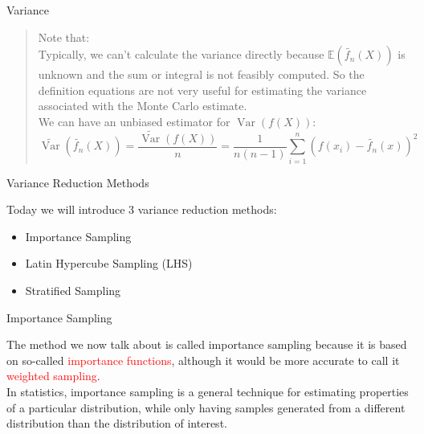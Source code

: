 \begin{frame}{Variance}
\begin{quote}

Note that:\\
Typically, we can't calculate the variance directly because $\mathbb{E}\left(\widetilde{f_{n}}(X)\right)$ is unknown and the sum or integral is not feasibly computed. So the definition equations are not very useful for estimating the variance associated with the Monte Carlo estimate.\\ 
We can have an unbiased estimator for $\operatorname{Var}(f(X))$:\\

\[ \widetilde{\operatorname{Var}}\left(\widetilde{f_{n}}(X)\right)=\frac{\widetilde{\operatorname{Var}}(f(X))}{n}=\frac{1}{n(n-1)} \sum_{i=1}^{n}\left(f\left(x_{i}\right)-\widetilde{f_{n}}(x)\right)^{2} \]

\end{quote}

\end{frame}

\begin{frame}{Variance Reduction Methods}

Today we will introduce 3 variance reduction methods:\\
\begin{itemize}
\item Importance Sampling
\item Latin Hypercube Sampling (LHS)
\item Stratified Sampling

\end{itemize}
\end{frame}

\begin{frame}{Importance Sampling}
\begin{definition}
The method we now talk about is called importance sampling because it is based on so-called \textcolor{red}{importance functions}, although it would be more accurate to call it \textcolor{red}{weighted sampling}.\\
In statistics, importance sampling is a general technique for estimating properties of a particular distribution, while only having samples generated from a different distribution than the distribution of interest.
\end{definition}
\end{frame}

